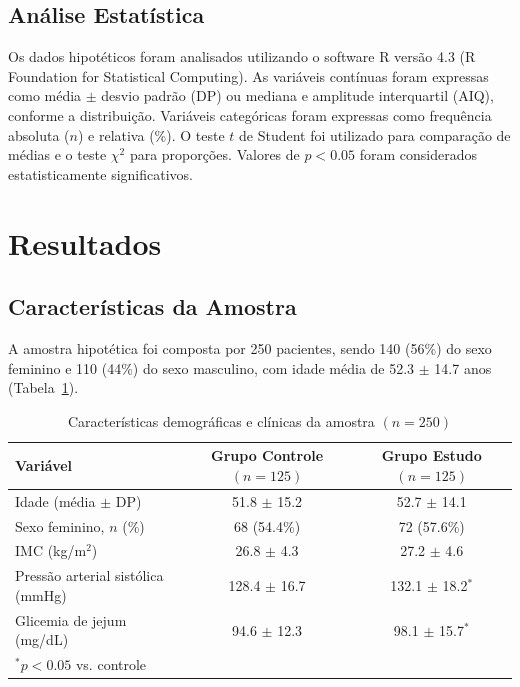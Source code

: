 \documentclass[12pt,a4paper]{article}
\begin{document}
\subsection{An\'alise Estat\'istica}

Os dados hipot\'eticos foram analisados utilizando o software R
vers\~ao 4.3 (R Foundation for Statistical Computing). As vari\'aveis
cont\'inuas foram expressas como m\'edia $\pm$ desvio padr\~ao
(DP) ou mediana e amplitude interquartil (AIQ), conforme a
distribui\c{c}\~ao. Vari\'aveis categ\'oricas foram expressas como
frequ\^encia absoluta ($n$) e relativa (\%). O teste $t$ de Student
foi utilizado para compara\c{c}\~ao de m\'edias e o teste
$\chi^2$ para propor\c{c}\~oes. Valores de $p < 0.05$ foram
considerados estatisticamente significativos.

\section{Resultados}
\label{sec:resultados}

\subsection{Caracter\'isticas da Amostra}

A amostra hipot\'etica foi composta por 250 pacientes, sendo
140 (56\%) do sexo feminino e 110 (44\%) do sexo masculino, com
idade m\'edia de 52.3 $\pm$ 14.7 anos (Tabela~\ref{tab:demografica}).

\begin{table}[htbp]
\centering
\caption{Caracter\'isticas demogr\'aficas e cl\'inicas da
         amostra $(n = 250)$}
\label{tab:demografica}
\begin{tabular}{lcc}
\toprule
Vari\'avel & Grupo Controle $(n = 125)$ & Grupo Estudo $(n = 125)$ \\
\midrule
Idade (m\'edia $\pm$ DP) & 51.8 $\pm$ 15.2 & 52.7 $\pm$ 14.1 \\
Sexo feminino, $n$ (\%) & 68 (54.4\%) & 72 (57.6\%) \\
IMC (kg/m$^2$) & 26.8 $\pm$ 4.3 & 27.2 $\pm$ 4.6 \\
Press\~ao arterial sist\'olica (mmHg) & 128.4 $\pm$ 16.7 & 132.1 $\pm$ 18.2$^*$ \\
Glicemia de jejum (mg/dL) & 94.6 $\pm$ 12.3 & 98.1 $\pm$ 15.7$^*$ \\
\midrule
\multicolumn{3}{l}{\small $^* p < 0.05$ vs. controle} \\
\end{tabular}
\end{table}
\end{document}
